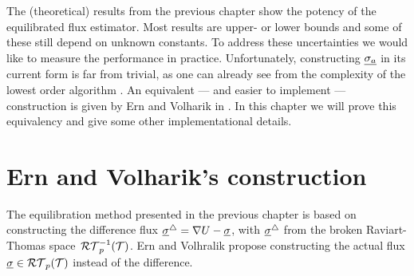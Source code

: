 \documentclass[thesis.tex]{subfiles}
\begin{document}
The (theoretical) results from the previous chapter show the potency of the equilibrated flux estimator. 
Most results are upper- or lower bounds and some of these still depend on unknown constants.
To address these uncertainties we would like to measure the performance in practice.
Unfortunately, constructing $\underline{\sigma_a}$ in its current form is far from trivial, as one can already see from
the complexity of the lowest order algorithm \cite[Alg~4]{braess2006equilibrated}.
An equivalent --- and easier to implement --- construction is given by Ern and Volharik in \cite{ernequil}. In this
chapter we will prove this equivalency and give some other implementational details.

\section{Ern and Volharik's construction}
The equilibration method presented in the previous chapter is based on constructing the difference flux $\underline{\sigma}^\triangle 
= \nabla U - \underline{\sigma}$, 
with $\underline{\sigma}^\triangle$ from the broken Raviart-Thomas space~$\mathcal{RT}_p^{-1}(\mathcal{T})$. 
Ern and Volhralik \cite{ernequil} propose constructing the actual flux $\underline{\sigma} \in \mathcal{RT}_p(\mathcal{T})$ instead of the difference.
\end{document}

